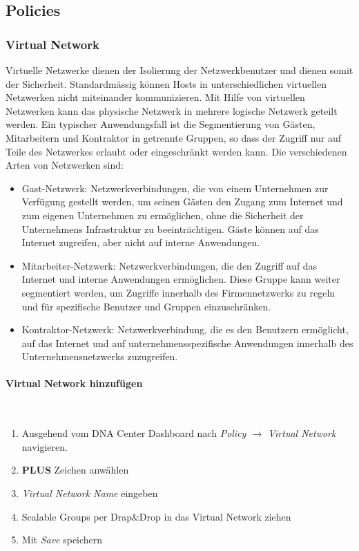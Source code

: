 \subsection{Policies}

\subsubsection{Virtual Network}
Virtuelle Netzwerke dienen der Isolierung der Netzwerkbenutzer und dienen somit der Sicherheit. Standardmässig können Hosts in unterschiedlichen virtuellen Netzwerken nicht miteinander kommunizieren. Mit Hilfe von virtuellen Netzwerken kann das physische Netzwerk in mehrere logische Netzwerk geteilt werden. Ein typischer Anwendungsfall ist die Segmentierung von Gästen, Mitarbeitern und Kontraktor in getrennte Gruppen, so dass der Zugriff nur auf Teile des Netzwerkes erlaubt oder eingeschränkt werden kann. Die verschiedenen Arten von Netzwerken sind:

\begin{itemize}
	\item Gast-Netzwerk: Netzwerkverbindungen, die von einem Unternehmen zur Verfügung gestellt werden, um seinen Gästen den Zugang zum Internet und zum eigenen Unternehmen zu ermöglichen, ohne die Sicherheit der Unternehmens Infrastruktur zu beeinträchtigen. Gäste können auf das Internet zugreifen, aber nicht auf interne Anwendungen.
	\item Mitarbeiter-Netzwerk: Netzwerkverbindungen, die den Zugriff auf das Internet und interne Anwendungen ermöglichen. Diese Gruppe kann weiter segmentiert werden, um Zugriffe innerhalb des Firmennetzwerks zu regeln und für spezifische Benutzer und Gruppen einzuschränken.
	\item Kontraktor-Netzwerk: Netzwerkverbindung, die es den Benutzern ermöglicht, auf das Internet und auf unternehmensspezifische Anwendungen innerhalb des Unternehmensnetzwerks zuzugreifen. 
\end{itemize}

\paragraph{Virtual Network hinzufügen}
~\\
\begin{enumerate}
	\item Ausgehend vom DNA Center Dashboard nach \textit{Policy $\rightarrow$ Virtual Network} navigieren.
	\item \textbf{PLUS} Zeichen anwählen
	\item \textit{Virtual Network Name} eingeben
	\item Scalable Groups per Drap\&Drop in das Virtual Network ziehen
	\item Mit \textit{Save} speichern
\end{enumerate}

